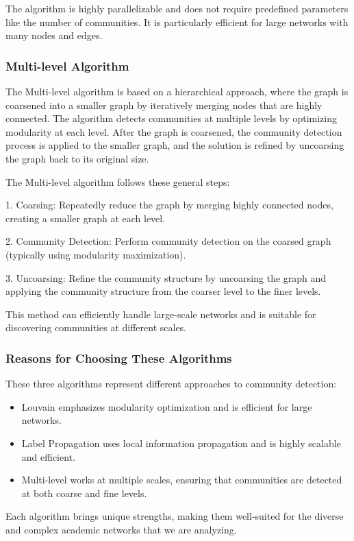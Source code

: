 \documentclass[11pt]{article}
\begin{document}
The algorithm is highly parallelizable and does not require predefined parameters like the number of communities. It is particularly efficient for large networks with many nodes and edges.

\subsubsection{Multi-level Algorithm}
The Multi-level algorithm is based on a hierarchical approach, where the graph is coarsened into a smaller graph by iteratively merging nodes that are highly connected. The algorithm detects communities at multiple levels by optimizing modularity at each level. After the graph is coarsened, the community detection process is applied to the smaller graph, and the solution is refined by uncoarsing the graph back to its original size.

The Multi-level algorithm follows these general steps:

1. Coarsing: Repeatedly reduce the graph by merging highly connected nodes, creating a smaller graph at each level.

2. Community Detection: Perform community detection on the coarsed graph (typically using modularity maximization).

3. Uncoarsing: Refine the community structure by uncoarsing the graph and applying the community structure from the coarser level to the finer levels.

This method can efficiently handle large-scale networks and is suitable for discovering communities at different scales.

\subsubsection{Reasons for Choosing These Algorithms}
These three algorithms represent different approaches to community detection:
\begin{itemize}
    \item Louvain emphasizes modularity optimization and is efficient for large networks.
    \item Label Propagation uses local information propagation and is highly scalable and efficient.
    \item Multi-level works at multiple scales, ensuring that communities are detected at both coarse and fine levels.
\end{itemize}

Each algorithm brings unique strengths, making them well-suited for the diverse and complex academic networks that we are analyzing.
\end{document}
